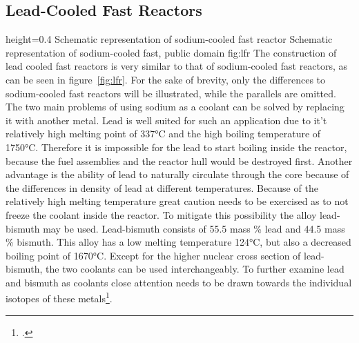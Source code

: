 \subsection{Lead-Cooled Fast Reactors}
    {height=0.4\textheight}
    {Schematic representation of sodium-cooled fast reactor}
    {Schematic representation of sodium-cooled fast, public domain}
    {fig:lfr}
The construction of lead cooled fast reactors is very similar to that of sodium-cooled fast reactors,
as can be seen in figure~\ref{fig:lfr}. For the sake of brevity, only the differences to sodium-cooled
fast reactors will be illustrated, while the parallels are omitted.\\
The two main problems of using sodium as a coolant can be solved by replacing it with another metal.
Lead is well suited for such an application due to it't relatively high melting point of 337°C and
the high boiling temperature of 1750°C. Therefore it is impossible for the lead to start boiling inside
the reactor, because the fuel assemblies and the reactor hull would be destroyed first.
Another advantage is the ability of lead to naturally circulate through the core because of the differences
in density of lead at different temperatures.
Because of the relatively high melting temperature great caution needs to be exercised as to not freeze the coolant
inside the reactor. To mitigate this possibility the alloy lead-bismuth may be used. Lead-bismuth consists
of 55.5 mass \% lead and 44.5 mass \% bismuth. This alloy has a low melting temperature 124°C, but also
a decreased boiling point of 1670°C. Except for the higher nuclear cross section of lead-bismuth, the
two coolants can be used interchangeably. To further examine lead and bismuth as coolants close attention
needs to be drawn towards the individual isotopes of these metals\footcite[137-174]{IVHandbook}.
